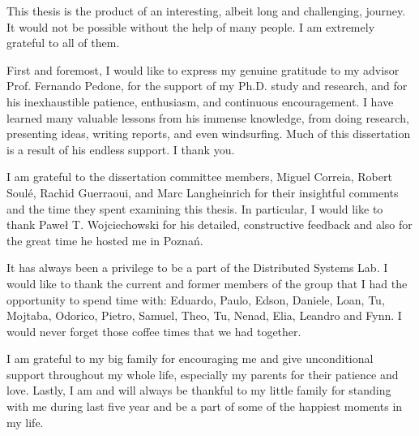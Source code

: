 \begin{acknowledgements}

This thesis is the product of an interesting, albeit long and challenging,
journey. It would not be possible without the help of many people. I am
extremely grateful to all of them.

First and foremost, I would like to express my genuine gratitude to my advisor
Prof. Fernando Pedone, for the support of my Ph.D. study and research, and for
his inexhaustible patience, enthusiasm, and continuous encouragement. I have
learned many valuable lessons from his immense knowledge, from doing research,
presenting ideas, writing reports, and even windsurfing. Much of this
dissertation is a result of his endless support. I thank you.
  
I am grateful to the dissertation committee members, Miguel Correia, Robert
Soul\'e, Rachid Guerraoui, and Marc Langheinrich for their insightful comments
and the time they spent examining this thesis. In particular, I would like to
thank Paweł T. Wojciechowski for his detailed, constructive feedback and also
for the great time he hosted me in Poznań.
  
It has always been a privilege to be a part of the Distributed Systems Lab. I
would like to thank the current and former members of the group that I had the
opportunity to spend time with: Eduardo, Paulo, Edson, Daniele, Loan, Tu,
Mojtaba, Odorico, Pietro, Samuel, Theo, Tu, Nenad, Elia, Leandro and Fynn. I
would never forget those coffee times that we had together.
  
I am grateful to my big family for encouraging me and give unconditional support
throughout my whole life, especially my parents for their patience and love.
Lastly, I am and will always be thankful to my little family for standing with
me during last five year and be a part of some of the happiest moments in my
life.

\end{acknowledgements}
